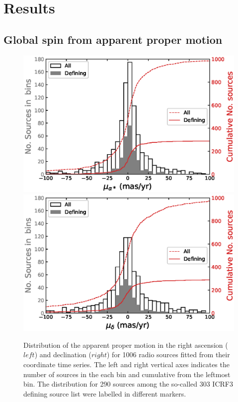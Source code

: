 \documentclass{aa}
\begin{document}

\section{Results}  \label{sec:results}


\subsection{Global spin from apparent proper motion}  \label{subsec:spin-from-apm}

    \begin{figure}
        \label{fig:apm-dist}%
        \centering
        \includegraphics[width=\columnwidth]{figs/pmra-hist}
        \includegraphics[width=\columnwidth]{figs/pmdec-hist}
        \caption{Distribution of the apparent proper motion in the right ascension ($left$) and declination ($right$) for 1006 radio sources fitted from their coordinate time series.
            The left and right vertical axes indicates the number of sources in the each bin and cumulative from the leftmost bin.
            The distribution for 290 sources among the so-called 303 ICRF3 defining source list were labelled in different markers.}
    \end{figure}
\end{document}

